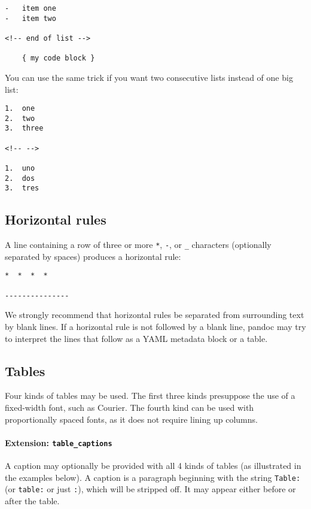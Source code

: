 \documentclass[
  a4paper,
]{article}
\begin{document}
\begin{verbatim}
-   item one
-   item two

<!-- end of list -->

    { my code block }
\end{verbatim}

You can use the same trick if you want two consecutive lists instead of
one big list:

\begin{verbatim}
1.  one
2.  two
3.  three

<!-- -->

1.  uno
2.  dos
3.  tres
\end{verbatim}

\hypertarget{horizontal-rules}{%
\subsection{Horizontal rules}\label{horizontal-rules}}

A line containing a row of three or more \texttt{*}, \texttt{-}, or
\texttt{\_} characters (optionally separated by spaces) produces a
horizontal rule:

\begin{verbatim}
*  *  *  *

---------------
\end{verbatim}

We strongly recommend that horizontal rules be separated from
surrounding text by blank lines. If a horizontal rule is not followed by
a blank line, pandoc may try to interpret the lines that follow as a
YAML metadata block or a table.

\hypertarget{tables}{%
\subsection{Tables}\label{tables}}

Four kinds of tables may be used. The first three kinds presuppose the
use of a fixed-width font, such as Courier. The fourth kind can be used
with proportionally spaced fonts, as it does not require lining up
columns.

\hypertarget{extension-table_captions}{%
\paragraph{\texorpdfstring{Extension:
\texttt{table\_captions}}{Extension: table\_captions}}\label{extension-table_captions}}

A caption may optionally be provided with all 4 kinds of tables (as
illustrated in the examples below). A caption is a paragraph beginning
with the string \texttt{Table:} (or \texttt{table:} or just \texttt{:}),
which will be stripped off. It may appear either before or after the
table.
\end{document}
